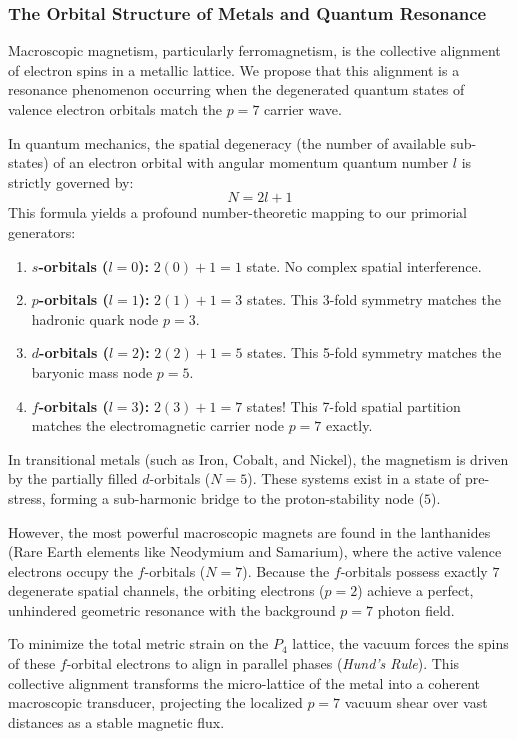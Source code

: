 \documentclass[11pt,a4paper]{article}
\theoremstyle{plain}
\theoremstyle{definition}
\theoremstyle{remark}
\begin{document}
\subsubsection{The Orbital Structure of Metals and Quantum Resonance}
Macroscopic magnetism, particularly ferromagnetism, is the collective alignment of electron spins in a metallic lattice. We propose that this alignment is a resonance phenomenon occurring when the degenerated quantum states of valence electron orbitals match the $p=7$ carrier wave.

In quantum mechanics, the spatial degeneracy (the number of available sub-states) of an electron orbital with angular momentum quantum number $l$ is strictly governed by:
\begin{equation}
N = 2l + 1
\end{equation}
This formula yields a profound number-theoretic mapping to our primorial generators:
\begin{enumerate}
    \item \textbf{$s$-orbitals ($l=0$):} $2(0) + 1 = 1$ state. No complex spatial interference.
    \item \textbf{$p$-orbitals ($l=1$):} $2(1) + 1 = 3$ states. This 3-fold symmetry matches the hadronic quark node $p=3$.
    \item \textbf{$d$-orbitals ($l=2$):} $2(2) + 1 = 5$ states. This 5-fold symmetry matches the baryonic mass node $p=5$.
    \item \textbf{$f$-orbitals ($l=3$):} $2(3) + 1 = 7$ states! This 7-fold spatial partition matches the electromagnetic carrier node $p=7$ exactly.
\end{enumerate}

In transitional metals (such as Iron, Cobalt, and Nickel), the magnetism is driven by the partially filled $d$-orbitals ($N=5$). These systems exist in a state of pre-stress, forming a sub-harmonic bridge to the proton-stability node ($5$). 

However, the most powerful macroscopic magnets are found in the lanthanides (Rare Earth elements like Neodymium and Samarium), where the active valence electrons occupy the $f$-orbitals ($N=7$). Because the $f$-orbitals possess exactly $7$ degenerate spatial channels, the orbiting electrons ($p=2$) achieve a perfect, unhindered geometric resonance with the background $p=7$ photon field. 

To minimize the total metric strain on the $P_4$ lattice, the vacuum forces the spins of these $f$-orbital electrons to align in parallel phases (\textit{Hund's Rule}). This collective alignment transforms the micro-lattice of the metal into a coherent macroscopic transducer, projecting the localized $p=7$ vacuum shear over vast distances as a stable magnetic flux.
\end{document}
